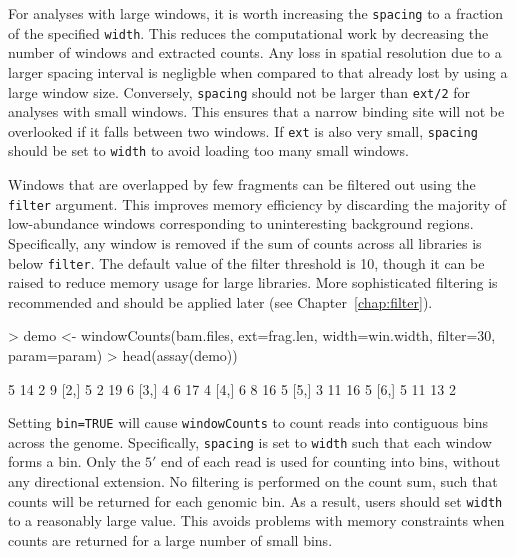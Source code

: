 \documentclass[12pt]{report}
\renewenvironment{Schunk}{\vspace{0pt}}{\vspace{0pt}}
\newcommand{\code}[1]{{\small\texttt{#1}}}
\begin{document}
For analyses with large windows, it is worth increasing the \code{spacing} to a fraction of the specified \code{width}. 
This reduces the computational work by decreasing the number of windows and extracted counts. 
Any loss in spatial resolution due to a larger spacing interval is negligble when compared to that already lost by using a large window size. 
Conversely, \code{spacing} should not be larger than \code{ext/2} for analyses with small windows.
This ensures that a narrow binding site will not be overlooked if it falls between two windows.
If \code{ext} is also very small, \code{spacing} should be set to \code{width} to avoid loading too many small windows.

Windows that are overlapped by few fragments can be filtered out using the \code{filter} argument. 
This improves memory efficiency by discarding the majority of low-abundance windows corresponding to uninteresting background regions. 
Specifically, any window is removed if the sum of counts across all libraries is below \code{filter}.
The default value of the filter threshold is 10, though it can be raised to reduce memory usage for large libraries.
More sophisticated filtering is recommended and should be applied later (see Chapter~\ref{chap:filter}).

\begin{Schunk}
\begin{Sinput}
> demo <- windowCounts(bam.files, ext=frag.len, width=win.width, filter=30, param=param)
> head(assay(demo))
\end{Sinput}
\begin{Soutput}
     [,1] [,2] [,3] [,4]
[1,]    5   14    2    9
[2,]    5    2   19    6
[3,]    4    6   17    4
[4,]    6    8   16    5
[5,]    3   11   16    5
[6,]    5   11   13    2
\end{Soutput}
\end{Schunk}

Setting \code{bin=TRUE} will cause \code{windowCounts} to count reads into contiguous bins across the genome.
Specifically, \code{spacing} is set to \code{width} such that each window forms a bin.
Only the $5'$ end of each read is used for counting into bins, without any directional extension.
No filtering is performed on the count sum, such that counts will be returned for each genomic bin. 
As a result, users should set \code{width} to a reasonably large value.
This avoids problems with memory constraints when counts are returned for a large number of small bins.
\end{document}
